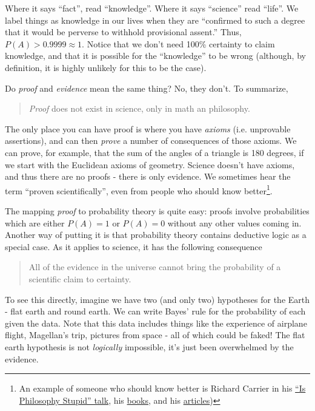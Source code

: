 Where it says ``fact'', read ``knowledge''.  Where it says ``science''
read ``life''.  We label things as knowledge in our lives when they are
``confirmed to such a degree that it would be perverse to withhold
provisional assent.''  Thus, $P(A)>0.9999 \approx 1$.  Notice that we don't need 100\% certainty to claim knowledge, and that it is possible for the ``knowledge'' to be wrong (although, by definition, it is highly unlikely for this to be the case).  

Do {\em proof} and {\em evidence} mean the same thing?  No, they don't. To summarize,

\begin{quote}
\emph{Proof} does not exist in science, only in math an philosophy.
\end{quote}

The only place you can have proof is where you have \emph{axioms}
(i.e. unprovable assertions), and can then \emph{prove} a number of
consequences of those axioms. We can prove, for example, that the sum of
the angles of a triangle is 180 degrees, if we start with the Euclidean
axioms of geometry. Science doesn't have axioms, and thus there are no
proofs - there is only evidence. We sometimes hear the term ``proven
scientifically'', even from people who should know better\footnote{An example of someone who should know better is Richard
Carrier in his \href{http://www.youtube.com/watch?v=YLvWz9GQ3PQ}{``Is
Philosophy Stupid'' talk}, his
\href{http://www.amazon.com/Proving-History-Bayess-Theorem-Historical/dp/1616145595}{books},
and his
\href{http://infidels.org/library/modern/richard_carrier/theory.html}{articles})}.

The mapping {\em proof} to probability theory is quite easy: proofs involve probabilities which are either $P(A)=1$ or $P(A)=0$ without any other values coming in.  Another way of putting it is that probability theory contains deductive logic as a special case.  As it applies to science, it has the following consequence

\begin{quote}
All of the evidence in the universe cannot bring the probability of a
scientific claim to certainty.
\end{quote}

To see this directly, imagine we have two (and only two) hypotheses for
the Earth - flat earth and round earth. We can write Bayes' rule for the
probability of each given the data. Note that this data includes things
like the experience of airplane flight, Magellan's trip, pictures from
space - all of which could be faked! The flat earth hypothesis is not
\emph{logically} impossible, it's just been overwhelmed by the evidence.

